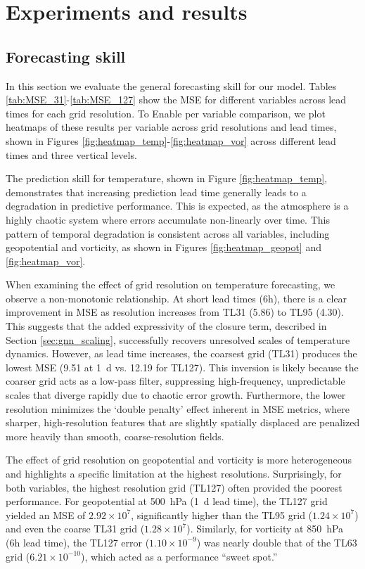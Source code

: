 \chapter{Experiments and results}
\label{AER}


\section{Forecasting skill}
In this section we evaluate the general forecasting skill for our model. Tables \ref{tab:MSE_31}-\ref{tab:MSE_127} show the MSE for different variables across lead times for each grid resolution. To Enable per variable comparison, we plot heatmaps of these results per variable across grid resolutions and lead times, shown in Figures \ref{fig:heatmap_temp}-\ref{fig:heatmap_vor} across different lead times and three vertical levels. 

The prediction skill for temperature, shown in Figure \ref{fig:heatmap_temp}, demonstrates that increasing prediction lead time generally leads to a degradation in predictive performance. This is expected, as the atmosphere is a highly chaotic system where errors accumulate non-linearly over time. This pattern of temporal degradation is consistent across all variables, including geopotential and vorticity, as shown in Figures \ref{fig:heatmap_geopot} and \ref{fig:heatmap_vor}.

When examining the effect of grid resolution on temperature forecasting, we observe a non-monotonic relationship. At short lead times (6h), there is a clear improvement in MSE as resolution increases from TL31 (5.86) to TL95 (4.30). This suggests that the added expressivity of the closure term, described in Section \ref{sec:gnn_scaling}, successfully recovers unresolved scales of temperature dynamics. However, as lead time increases, the coarsest grid (TL31) produces the lowest MSE (9.51 at 1~d vs. 12.19 for TL127). This inversion is likely because the coarser grid acts as a low-pass filter, suppressing high-frequency, unpredictable scales that diverge rapidly due to chaotic error growth. Furthermore, the lower resolution minimizes the `double penalty' effect inherent in MSE metrics, where sharper, high-resolution features that are slightly spatially displaced are penalized more heavily than smooth, coarse-resolution fields.

The effect of grid resolution on geopotential and vorticity is more heterogeneous and highlights a specific limitation at the highest resolutions. Surprisingly, for both variables, the highest resolution grid (TL127) often provided the poorest performance. For geopotential at 500~hPa (1~d lead time), the TL127 grid yielded an MSE of $2.92 \times 10^7$, significantly higher than the TL95 grid ($1.24 \times 10^7$) and even the coarse TL31 grid ($1.28 \times 10^7$). Similarly, for vorticity at 850~hPa (6h lead time), the TL127 error ($1.10 \times 10^{-9}$) was nearly double that of the TL63 grid ($6.21 \times 10^{-10}$), which acted as a performance ``sweet spot.''

